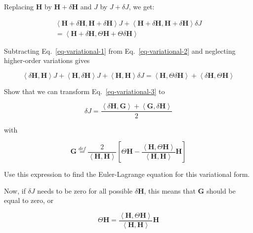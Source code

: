 Replacing ${\mathbf H}$ by ${\mathbf H} + \delta {\mathbf H}$ and $J$ by $J+ \delta J$, we get:

\begin{align}
\left\langle {\mathbf H + \delta {\mathbf H}},{\mathbf H}+\delta {\mathbf H} \right\rangle J + \left\langle {\mathbf H}+\delta {\mathbf H},{\mathbf H+\delta {\mathbf H}} \right\rangle \delta  J \nonumber  \\
  = \left\langle {\mathbf H}+\delta {\mathbf H},\Theta {\mathbf H} + \Theta \delta {\mathbf H} \right\rangle
\label{eq-variational-2}
\end{align} 

Subtracting Eq.~\ref{eq-variational-1} from Eq.~\ref{eq-variational-2} and neglecting higher-order variations gives

\begin{equation}
\left\langle \delta {\mathbf H},{\mathbf H} \right\rangle J + \left\langle {\mathbf H},\delta {\mathbf H} \right\rangle J + \left\langle {\mathbf H}, {\mathbf H} \right\rangle \delta J = \left\langle {\mathbf H},\Theta \delta {\mathbf H} \right\rangle + \left\langle \delta {\mathbf H},\Theta {\mathbf H} \right\rangle \label{eq-variational-3}
\end{equation} 


\begin{exer}
Show that we can transform Eq.~\ref{eq-variational-3} to

$$\delta J = \frac {\left\langle \delta {\mathbf H} , {\mathbf G} \right\rangle + \left\langle {\mathbf G} , \delta {\mathbf H} \right\rangle}{2}$$

with

$${\mathbf G} \stackrel{def}{=} \frac{2}{\left\langle {\mathbf H} , {\mathbf H}\right\rangle } \left[ \Theta {\mathbf H} - \frac{\left\langle {\mathbf H} , \Theta {\mathbf H}\right\rangle}{\left\langle {\mathbf H} , {\mathbf H}\right\rangle} {\mathbf H} \right]  $$
\end{exer}

\begin{cue}
Use this expression to find the Euler-Lagrange equation for this variational form.  
\end{cue}

Now, if $\delta J$ needs to be zero for all possible ${\delta \mathbf H}$, this means that ${\mathbf G}$ should be equal to zero, or

\begin{equation}
\Theta {\mathbf H} = \frac{\left\langle {\mathbf H} , \Theta {\mathbf H}\right\rangle}{\left\langle {\mathbf H} , {\mathbf H}\right\rangle} {\mathbf H} \label{eq-variational-4}
\end{equation} 

